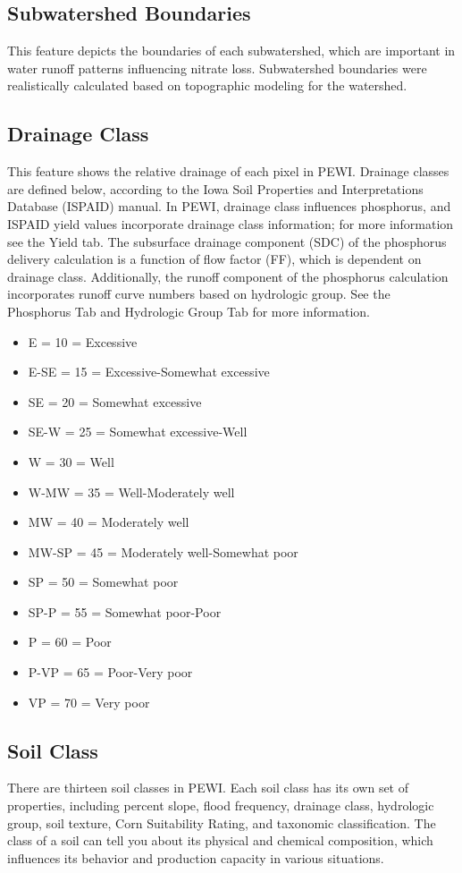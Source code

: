 \documentclass[11pt]{article}
\begin{document}
\subsection{Subwatershed Boundaries}
This feature depicts the boundaries of each subwatershed, which are important in water runoff patterns influencing nitrate loss. Subwatershed boundaries were realistically calculated based on topographic modeling for the watershed. 

\subsection{Drainage Class}

This feature shows the relative drainage of each pixel in PEWI. Drainage classes are defined below, according to the Iowa Soil Properties and Interpretations Database (ISPAID) manual.\cite{29}  In PEWI, drainage class influences phosphorus, and ISPAID yield values incorporate drainage class information; for more information see the Yield tab.\cite{30} The subsurface drainage component (SDC) of the phosphorus delivery calculation is a function of flow factor (FF), which is dependent on drainage class. Additionally, the runoff component of the phosphorus calculation incorporates runoff curve numbers based on hydrologic group. See the Phosphorus Tab and Hydrologic Group Tab for more information. 

\begin{itemize}
\item E	=	10	=	Excessive
\item E-SE	=	15	=	Excessive-Somewhat excessive
\item SE	=	20	=	Somewhat excessive
\item SE-W	=	25	=	Somewhat excessive-Well
\item W	=	30	=	Well
\item W-MW	=	35	=	Well-Moderately well
\item MW	=	40	=	Moderately well
\item MW-SP	=	45	=	Moderately well-Somewhat poor 
\item SP	=	50	=	Somewhat poor
\item SP-P	=	55	=	Somewhat poor-Poor
\item P	=	60	=	Poor
\item P-VP	=	65	=	Poor-Very poor
\item VP	=	70	=	Very poor
\end{itemize}
\subsection{Soil Class}
There are thirteen soil classes in PEWI. Each soil class has its own set of properties, including percent slope, flood frequency, drainage class, hydrologic group, soil texture, Corn Suitability Rating, and taxonomic classification. The class of a soil can tell you about its physical and chemical composition, which influences its behavior and production capacity in various situations. 
\end{document}
